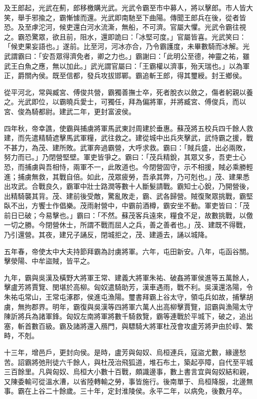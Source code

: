 \begin{pinyinscope}
及王郎起，光武在薊，郎移檄購光武。光武令霸至市中募人，將以擊郎。市人皆大笑，舉手邪揄之，霸慚懅而還。光武即南馳至下曲陽。傳聞王郎兵在後，從者皆恐。及至虖沱河，候吏還白河水流澌，無船，不可濟。官屬大懼。光武令霸往視之。霸恐驚眾，欲且前，阻水，還即詭曰：「冰堅可度。」官屬皆喜。光武笑曰：「候吏果妄語也。」遂前。比至河，河冰亦合，乃令霸護度，未畢數騎而冰解。光武謂霸曰：「安吾眾得濟免者，卿之力也。」霸謝曰：「此明公至德，神靈之祐，雖武王白魚之應，無以加此。」武光謂官屬曰：「王霸權以濟事，殆天瑞也。」以為軍正，爵關內侯。既至信都，發兵攻拔邯鄲。霸追斬王郎，得其璽綬。封王鄉侯。

從平河北，常與臧宮、傅俊共營，霸獨善撫士卒，死者脫衣以斂之，傷者躬親以養之。光武即位，以霸曉兵愛士，可獨任，拜為偏將軍，并將臧宮、傅俊兵，而以宮、俊為騎都尉。建武二年，更封富波侯。

四年秋，帝幸譙，使霸與捕虜將軍馬武東討周建於垂惠。蘇茂將五校兵四千餘人救建，而先遣精騎遮擊馬武軍糧，武往救之。建從城中出兵夾擊武，武恃霸之援，戰不甚力，為茂、建所敗。武軍奔過霸營，大呼求救。霸曰：「賊兵盛，出必兩敗，努力而已。」乃閉營堅壁。軍吏皆爭之。霸曰：「茂兵精銳，其眾又多，吾吏士心恐，而捕虜與吾相恃，兩軍不一，此敗道也。今閉營固守，示不相援，賊必乘勝輕進；捕虜無救，其戰自倍。如此，茂眾疲勞，吾承其弊，乃可剋也。」茂、建果悉出攻武。合戰良久，霸軍中壯士路潤等數十人斷髮請戰。霸知士心銳，乃開營後，出精騎襲其背。茂、建前後受敵，驚亂敗走，霸、武各歸營。賊復聚眾挑戰，霸堅臥不出，方饗士作倡樂。茂雨射營中，中霸前酒樽，霸安坐不動。軍吏皆曰：「茂前日已破；今易擊也。」霸曰：「不然。蘇茂客兵遠來，糧食不足，故數挑戰，以儌一切之勝。今閉營休士，所謂不戰而屈人之兵，善之善者也。」茂、建既不得戰，乃引還營。其夜，建兄子誦反，閉城拒之，茂、建遁去，誦以城降。

五年春，帝使太中大夫持節拜霸為討虜將軍。六年，屯田新安。八年，屯函谷關。擊滎陽、中牟盜賊，皆平之。

九年，霸與吳漢及橫野大將軍王常、建義大將軍朱祐、破姦將軍侯進等五萬餘人，擊盧芳將賈覽、閔堪於高柳。匈奴遣騎助芳，漢車遇雨，戰不利。吳漢還洛陽，令朱祐屯常山，王常屯涿郡，侯進屯漁陽。璽書拜霸上谷太守，領屯兵如故，捕擊胡虜，無拘郡界。明年，霸復與吳漢等四將軍六萬人出高柳擊賈覽，詔霸與漁陽太守陳訢將兵為諸軍鋒。匈奴左南將軍將數千騎救覽，霸等連戰於平城下，破之，追出塞，斬首數百級。霸及諸將還入鴈門，與驃騎大將軍杜茂會攻盧芳將尹由於崞、繁畤，不剋。

十三年，增邑戶，更封向侯。是時，盧芳與匈奴、烏桓連兵，寇盜尤數，緣邊愁苦。詔霸將弛刑徒六千餘人，與杜茂治飛狐道，堆石布土，築起亭障，自代至平城三百餘里。凡與匈奴、烏桓大小數十百戰，頗識邊事，數上書言宜與匈奴結和親，又陳委輸可從溫水漕，以省陸轉輸之勞，事皆施行。後南單于、烏桓降服，北邊無事。霸在上谷二十餘歲。三十年，定封淮陵侯。永平二年，以病免，後數月卒。


\end{pinyinscope}

